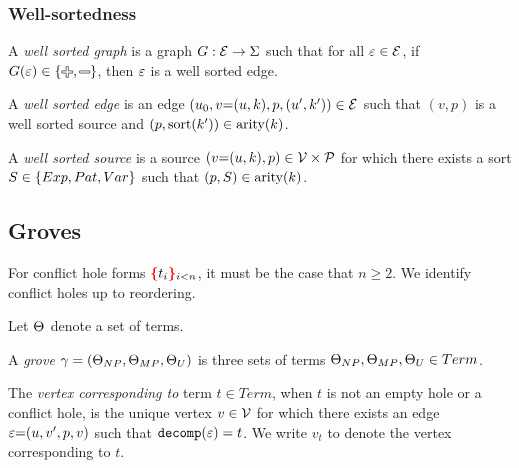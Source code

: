 
\subsubsection{Well-sortedness}

\begin{definition}
  A \emph{well sorted graph} is a graph $G : \E \rightarrow \Sigma$
  such that for all $\e \in \E$,
  if $G(\e) \in \SetOf{\Plus, \Minus}$,
  then $\e$ is a well sorted edge. 
\end{definition}

\begin{definition}
  A \emph{well sorted edge} is an edge $(u_0, v{=}(u, k), p, (u', k')) \in \E$
  such that $(v, p)$ is a well sorted source
  and $(p, \sort{k'}) \in \arity{k}$.
\end{definition}

\begin{definition}
  A \emph{well sorted source} is a source $(v{=}(u, k), p) \in \V \times \P$
  for which there exists a sort $S \in \SetOf{Exp, Pat, Var}$
  such that $(p, S) \in \arity{k}$.
\end{definition}


\subsection{Groves}
\label{sec:Formalism:Groves}

\figureTermSyntaxContent

For conflict hole forms $\conflictHole[i < n]{t_i}$,
it must be the case that $n \geq 2$.
We identify conflict holes up to reordering.

Let $\Set$ denote a set of terms.

\begin{definition}
  A \emph{grove} $\Grove = (\Set[NP], \Set[MP], \Set[U])$
  is three sets of terms $\Set[NP], \Set[MP], \Set[U] \in Term$.
\end{definition}

\begin{definition}
  The \emph{vertex corresponding to} term $t \in Term$,
  when $t$ is not an empty hole or a conflict hole,
  is the unique vertex $v \in \V$ for which there exists an edge $\e{=}(u, v', p, v)$
  such that $\decomp{\e} = t$.
  We write $v_t$ to denote the vertex corresponding to $t$.
\end{definition}

